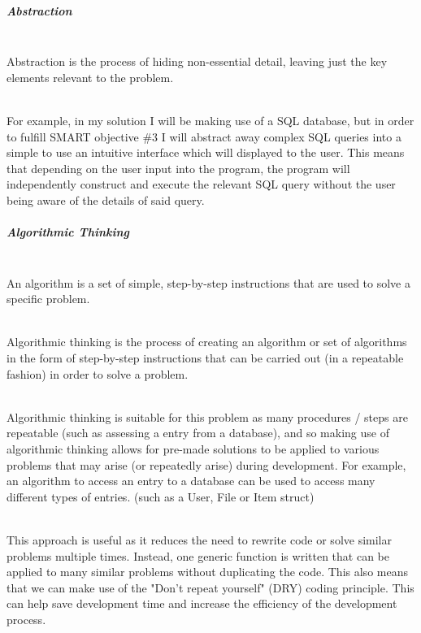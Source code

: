 \documentclass[../../../main.tex]{subfiles}
\begin{document}
\subparagraph{Abstraction}

\noindent \\ Abstraction is the process of hiding non-essential detail, leaving just the key elements relevant to the problem.

\noindent \\ For example, in my solution I will be making use of a SQL database, but in order to fulfill SMART objective
\#3 I will abstract away complex SQL queries into a simple to use an intuitive interface which
will displayed to the user. This means that depending on the user input into the program, the
program will independently construct and execute the relevant SQL query without the user being
aware of the details of said query.

\subparagraph{Algorithmic Thinking}

\noindent \\ An algorithm is a set of simple, step-by-step instructions that are used to solve a specific problem.

\noindent \\ Algorithmic thinking is the process of creating an algorithm or set of algorithms
in the form of step-by-step instructions that can be carried out (in a repeatable fashion)
in order to solve a problem.

\noindent \\ Algorithmic thinking is suitable for this problem as many procedures / steps are
repeatable (such as assessing a entry from a database), and so making use of algorithmic
thinking allows for pre-made solutions to be applied to various problems that may arise (or repeatedly arise) during
development. For example, an algorithm to access an entry to a database can be used to access
many different types of entries. (such as a User, File or Item struct)

\noindent \\ This approach is useful as it reduces the need to rewrite code or solve similar problems multiple times.
Instead, one generic function is written that can be applied to many similar problems without duplicating the code.
This also means that we can make use of the "Don't repeat yourself" (DRY) coding principle. This can help save development time and increase the efficiency of the development process.
\end{document}
